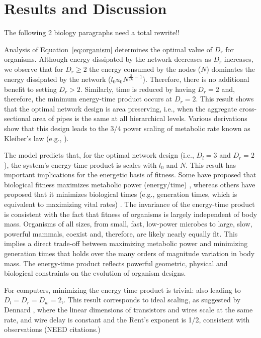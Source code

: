 \documentclass[12pt]{article}
\begin{document}
\section{Results and Discussion}
\label{sec:discussion}

The following 2 biology paragraphs need a total rewrite!!
 
Analysis of Equation~\ref{eq:organism} determines the optimal value of $D_r$
for organisms. Although energy dissipated by the network decreases as $D_r$
increases, we observe that for $D_r \geq 2$ the energy consumed by the nodes
($N$) dominates the energy dissipated by the network ($l_0 u_0
N^{\frac{2}{D_r} - 1}$).  Therefore, there is no additional benefit to setting
$D_r>2$. Similarly, time is reduced by having $D_r=2$ and,
therefore, the minimum energy-time product occurs at $D_r = 2$.  This result
shows that the optimal network design is area preserving, i.e., when the
aggregate cross-sectional area of pipes is the same at all hierarchical levels.
Various derivations show that this design leads to the 3/4 power scaling of
metabolic rate known as Kleiber's law (e.g., \cite{west97, banavar10}).

The model predicts that, for the optimal network design (i.e., $D_l=3$  and
$D_r=2$), the system's energy-time product is scales with $l_0$ and $N$.
This result has important implications for the
energetic basis of fitness.  Some have proposed that biological fitness
maximizes metabolic power (energy/time) \cite{lotka56, odum71}, whereas others
have proposed that it minimizes biological times (e.g., generation times, which
is equivalent to maximizing vital rates) \cite{lindstedt81, sibly91}. The
invariance of the energy-time product is consistent with the fact that fitness
of organisms is largely independent of body mass.  Organisms of all sizes, from
small, fast, low-power microbes to large, slow, powerful mammals, coexist and,
therefore, are likely nearly equally fit.  This implies a direct trade-off
between maximizing metabolic power and minimizing generation times that holds
over the many orders of magnitude variation in body mass.  The energy-time
product reflects powerful geometric, physical and biological constraints on the
evolution of organism designs.

For computers, minimizing the energy time product is trivial: also leading to
$D_l=D_r=D_w = 2$,.  This result corresponds to ideal scaling, as suggested by
Dennard \cite{dennard74}, where the linear dimensions of transistors and wires
scale at the same rate, and wire delay is constant and the Rent's exponent is
1/2, consistent with observations (NEED citations.)
\end{document}
